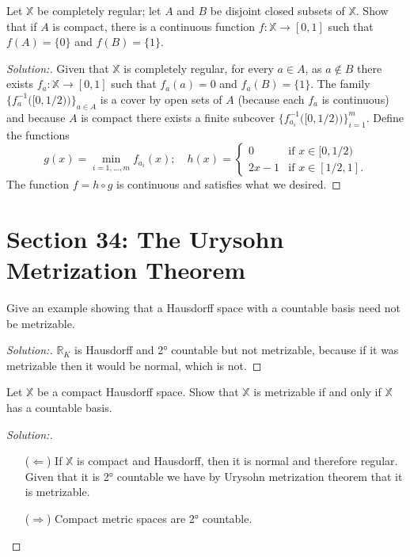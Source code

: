 \documentclass[a4paper,12pt, reqno]{article}
\theoremstyle{definition}
\newenvironment{exerr}[1]{
  \renewcommand\theexeralt{#1}
  \exeralt
}{\endexeralt}
\newenvironment{solution}{\begin{proof}[Solution:]}{\end{proof}}
\newcommand{\R}{\mathbb{R}}
\newcommand{\X}{\mathbb{X}}
\begin{document}
\begin{exerr}{8}
  Let $\X$ be completely regular; let $A$ and $B$ be disjoint closed subsets of $\X$. Show that if $A$ is compact, there is a continuous function $f:\X\to[0,1]$ such that $f(A)= \{ 0 \}$ and $f(B)=\{ 1 \}$.
\end{exerr}
\begin{solution}
  Given that $\X$ is completely regular, for every $a\in A$, as $a\notin B$ there exists $f_{a}: \X\to[0,1]$ such that $f_{a}(a) = 0$ and $f_{a}(B)= \{ 1 \}$. The family $\{ f_{a}^{-1}\big( [0,1/2) \big) \}_{a\in A}$ is a cover by open sets of $A$ (because each $f_{a}$ is continuous) and because $A$ is compact there exists a finite subcover $\{ f_{a_{i}}^{-1}\big( [0,1/2) \big) \}_{i=1}^m$. Define the functions
  \begin{equation*}
    g(x) = \min_{i=1,\dots,m}f_{a_{i}}(x); \quad h(x) = \begin{cases}
      0 &\text{if }x\in[0,1/2)\\
      2x-1 &\text{if }x\in[1/2,1].
    \end{cases}
  \end{equation*}
  The function $f = h\circ g$ is continuous and satisfies what we desired.
\end{solution}

\section*{Section 34: The Urysohn Metrization Theorem}


\begin{exerr}{1}
  Give an example showing that a Hausdorff space with a countable basis need not be metrizable.
\end{exerr}
\begin{solution}
  $\R_{K}$ is Hausdorff and 2° countable but not metrizable, because if it was metrizable then it would be normal, which is not.
\end{solution}

\begin{exerr}{3}
  Let $\X$ be a compact Hausdorff space. Show that $\X$ is metrizable if and only if $\X$ has a countable basis.
\end{exerr}
\begin{solution}\hfill
  \begin{itemize}
    \item[($\Longleftarrow$)] If $\X$ is compact and Hausdorff, then it is normal and therefore regular. Given that it is 2° countable we have by Urysohn metrization theorem that it is metrizable.
    \item[($\Longrightarrow$)] Compact metric spaces are 2° countable.
  \end{itemize}
\end{solution}
\end{document}
